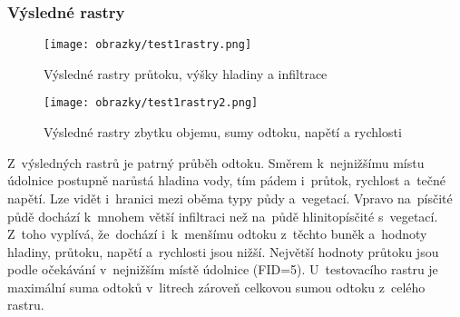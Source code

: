 \subsubsection{Výsledné rastry} \label{subsubsection:test1rastry}
\begin{figure}[hbt]
  \centering
  \texttt{[image: obrazky/test1rastry.png]}
  \caption{Výsledné rastry průtoku, výšky hladiny a infiltrace}
  \label{fig:test1rastry}
\end{figure}
\clearpage
\newpage
\begin{figure}[hbt]
  \centering
  \texttt{[image: obrazky/test1rastry2.png]}
  \caption{Výsledné rastry zbytku objemu, sumy odtoku, napětí a rychlosti}
  \label{fig:test1rastry2}
\end{figure}
\clearpage
Z~výsledných rastrů je patrný průběh odtoku. Směrem k~nejnižšímu místu údolnice postupně narůstá hladina vody, tím pádem i~průtok, rychlost a~tečné napětí. 
Lze vidět i~hranici mezi oběma typy půdy a~vegetací.  Vpravo na~písčité půdě dochází k~mnohem větší infiltraci než na~půdě hlinitopísčité s~vegetací. 
Z~toho vyplívá, že~dochází i~k~menšímu odtoku z~těchto buněk a~hodnoty hladiny, průtoku, napětí a~rychlosti jsou nižší. Největší hodnoty průtoku jsou podle očekávání v~nejnižším místě údolnice (FID=5). 
U~testovacího rastru je maximální suma odtoků v~litrech zároveň celkovou sumou odtoku z~celého rastru.
